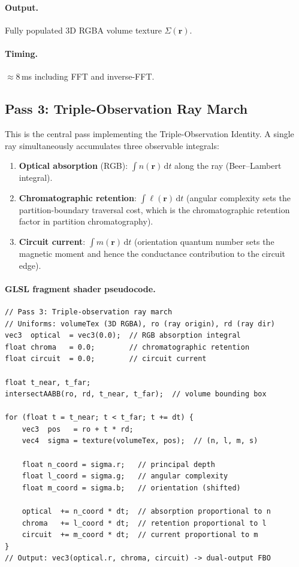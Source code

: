 \paragraph{Output.} Fully populated 3D RGBA volume texture $\Sigma(\mathbf{r})$.

\paragraph{Timing.} $\approx 8$\,ms including FFT and inverse-FFT.

\subsection{Pass 3: Triple-Observation Ray March}
\label{subsec:ch09-gpu-pass3}

This is the central pass implementing the Triple-Observation Identity.  A
single ray simultaneously accumulates three observable integrals:

\begin{enumerate}[leftmargin=2em,label=(\arabic*)]
  \item \textbf{Optical absorption} (RGB): $\int n(\mathbf{r})\,\mathrm{d}t$
    along the ray (Beer--Lambert integral).
  \item \textbf{Chromatographic retention}: $\int \ell(\mathbf{r})\,\mathrm{d}t$
    (angular complexity sets the partition-boundary traversal cost, which is
    the chromatographic retention factor in partition chromatography).
  \item \textbf{Circuit current}: $\int m(\mathbf{r})\,\mathrm{d}t$
    (orientation quantum number sets the magnetic moment and hence the
    conductance contribution to the circuit edge).
\end{enumerate}

\paragraph{GLSL fragment shader pseudocode.}
\begin{verbatim}
// Pass 3: Triple-observation ray march
// Uniforms: volumeTex (3D RGBA), ro (ray origin), rd (ray dir)
vec3  optical  = vec3(0.0);  // RGB absorption integral
float chroma   = 0.0;        // chromatographic retention
float circuit  = 0.0;        // circuit current

float t_near, t_far;
intersectAABB(ro, rd, t_near, t_far);  // volume bounding box

for (float t = t_near; t < t_far; t += dt) {
    vec3  pos   = ro + t * rd;
    vec4  sigma = texture(volumeTex, pos);  // (n, l, m, s)

    float n_coord = sigma.r;   // principal depth
    float l_coord = sigma.g;   // angular complexity
    float m_coord = sigma.b;   // orientation (shifted)

    optical  += n_coord * dt;  // absorption proportional to n
    chroma   += l_coord * dt;  // retention proportional to l
    circuit  += m_coord * dt;  // current proportional to m
}
// Output: vec3(optical.r, chroma, circuit) -> dual-output FBO
\end{verbatim}

